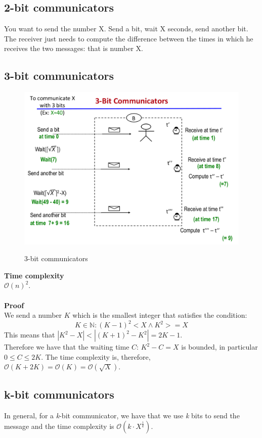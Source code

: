 \documentclass[paper=a4, fontsize=11pt]{scrartcl} %
\numberwithin{equation}{section} %
\numberwithin{figure}{section} %
\numberwithin{table}{section} %
\begin{document}
\subsection*{2-bit communicators}
You want to send the number X. Send a bit, wait X seconds, send another bit.
The receiver just needs to compute the difference between the times in which he receives the two messages: that is number X.

\subsection*{3-bit communicators}
\begin{figure}[H]
	\centering
	\includegraphics[width=0.85\linewidth]{img/3_bit_communication}
	\caption[3-bit communicators]{3-bit communicators}
	\caption{}
	\label{fig:3bitcommunication}
\end{figure}
\textbf{Time complexity} \\
$\mathcal{O}(n)^2$.
\\ \\ \textbf{Proof} \\
We send a number $K$ which is the smallest integer that satisfies the condition: $$ K \in \mathbb{N} : (K-1)^2 < X \land K^2 >= X$$
This means that $|K^2 - X| < |(K+1)^2 - K^2| = 2K - 1$. \\Therefore we have that the waiting time $C :\, K^2 - C = X$ is bounded, in particular $0 \le C \le 2K$. The time complexity is, therefore, $\mathcal{O}(K + 2K) = \mathcal{O}(K) = \mathcal{O}(\sqrt X)$.

\subsection*{k-bit communicators}
In general, for a \textit{k}-bit communicator, we have that we use \textit{k} bits to send the message and the time complexity is $\mathcal{O}(k\cdot X^{\frac{1}{k}})$.
\end{document}
